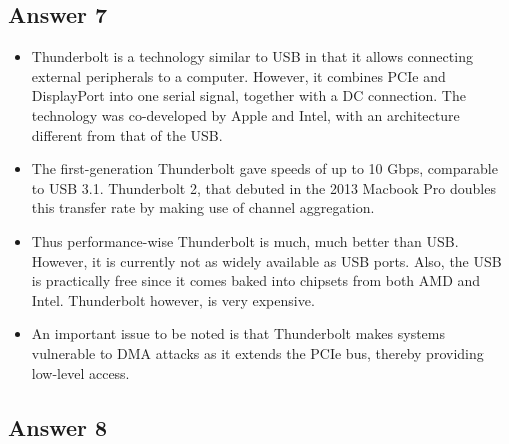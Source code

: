 \documentclass[]{article}
\begin{document}
\subsection{Answer 7}\label{answer-7}

\begin{itemize}
\itemsep1pt\parskip0pt
\item
  Thunderbolt is a technology similar to USB in that it allows
  connecting external peripherals to a computer. However, it combines
  PCIe and DisplayPort into one serial signal, together with a DC
  connection. The technology was co-developed by Apple and Intel, with
  an architecture different from that of the USB.
\item
  The first-generation Thunderbolt gave speeds of up to 10 Gbps,
  comparable to USB 3.1. Thunderbolt 2, that debuted in the 2013 Macbook
  Pro doubles this transfer rate by making use of channel aggregation.
\item
  Thus performance-wise Thunderbolt is much, much better than USB.
  However, it is currently not as widely available as USB ports. Also,
  the USB is practically free since it comes baked into chipsets from
  both AMD and Intel. Thunderbolt however, is very expensive.
\item
  An important issue to be noted is that Thunderbolt makes systems
  vulnerable to DMA attacks as it extends the PCIe bus, thereby
  providing low-level access.
\end{itemize}

\subsection{Answer 8}\label{answer-8}
\end{document}
